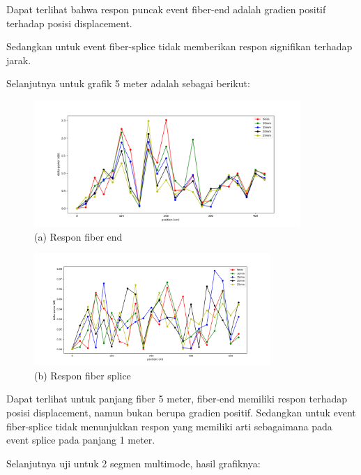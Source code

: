 \documentclass[12pt]{article}
\begin{document}
	\newpage
	Dapat terlihat bahwa respon puncak event fiber-end adalah gradien positif terhadap posisi displacement.
	
	Sedangkan untuk event fiber-splice tidak memberikan respon signifikan terhadap jarak.

	Selanjutnya untuk grafik 5 meter adalah sebagai berikut:
	
	\begin{figure}[!ht]
		\centering
		\captionsetup{justification=centering}
		\includegraphics[width=0.9\textwidth]{images/Bab_4/Bab_4_5g1}	
		\caption{\small{(a) Respon fiber end}}
	\end{figure}
	
	\begin{figure}[!ht]
		\centering
		\captionsetup{justification=centering}
		\includegraphics[width=0.8\textwidth]{images/Bab_4/Bab_4_5g2}	
		\caption{\small{(b) Respon fiber splice}}
	\end{figure}

	Dapat terlihat untuk panjang fiber 5 meter, fiber-end memiliki respon terhadap posisi displacement, namun bukan berupa gradien positif. 
	Sedangkan untuk event fiber-splice tidak menunjukkan respon yang memiliki arti sebagaimana pada event splice pada panjang 1 meter.
	
	Selanjutnya uji untuk 2 segmen multimode, hasil grafiknya:
	
\end{document}
